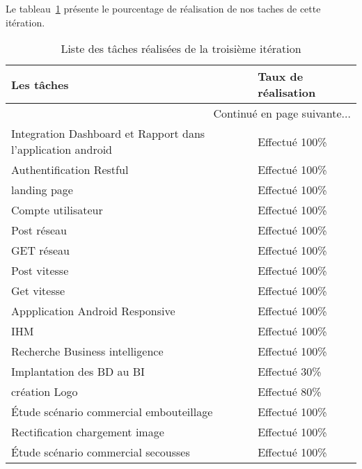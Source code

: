 Le tableau~\ref{tab:sprint3-evaluation} présente le pourcentage de
réalisation de nos taches de cette itération.

\begin{center}
    \begin{longtable}{| l | l |}
        \caption{Liste des tâches réalisées de la troisième itération}
        \label{tab:sprint3-evaluation} \\

        \hline
        \textbf{Les tâches} & \textbf{Taux de réalisation} \\ \hline
        \endhead

        \hline \multicolumn{2}{|r|}{{Continué en page suivante$\dotsc$}} \\ \hline
        \endfoot

        \hline \hline
        \endlastfoot

        \hline
Integration Dashboard et Rapport dans l'application android & Effectué 100\% \\ \hline
Authentification Restful&  Effectué 100\% \\ \hline
landing page& Effectué 100\% \\ \hline
Compte utilisateur& Effectué 100\% \\ \hline
Post réseau& Effectué 100\% \\ \hline
GET réseau&  Effectué 100\% \\ \hline
Post vitesse&  Effectué 100\% \\ \hline
Get vitesse& Effectué 100\% \\ \hline
Appplication Android Responsive & Effectué 100\% \\ \hline
IHM & Effectué 100\% \\ \hline
Recherche Business intelligence& Effectué 100\% \\ \hline
Implantation des BD au BI & Effectué 30\% \\ \hline
création Logo&  Effectué 80\% \\ \hline
Étude scénario commercial embouteillage& Effectué 100\% \\ \hline
Rectification chargement image & Effectué 100\% \\ \hline
Étude scénario commercial secousses &  Effectué 100\% \\ \hline
\end{longtable}
\end{center}